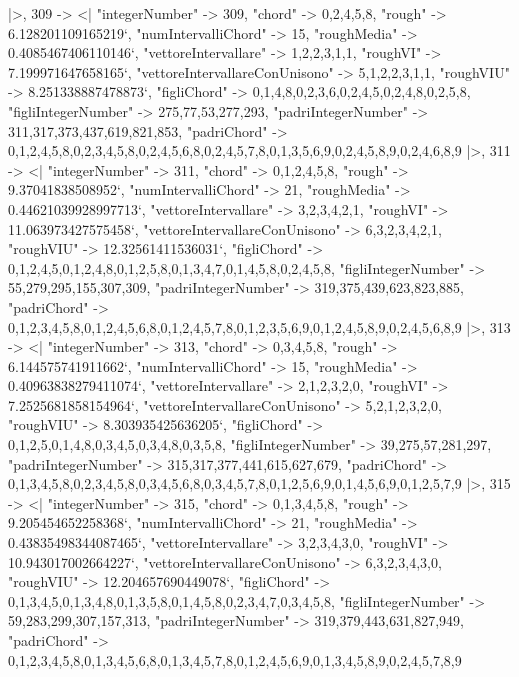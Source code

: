 \documentclass[
]{article}
\begin{document}
\begin{DatasetVerbatim}
  |>,
  309 -> <|
    "integerNumber" -> 309,
    "chord" -> {0,2,4,5,8},
    "rough" -> 6.128201109165219`,
    "numIntervalliChord" -> 15,
    "roughMedia" -> 0.4085467406110146`,
    "vettoreIntervallare" -> {1,2,2,3,1,1},
    "roughVI" -> 7.199971647658165`,
    "vettoreIntervallareConUnisono" -> {5,1,2,2,3,1,1},
    "roughVIU" -> 8.251338887478873`,
    "figliChord" -> {{0,1,4,8},{0,2,3,6},{0,2,4,5},{0,2,4,8},{0,2,5,8}},
    "figliIntegerNumber" -> {275,77,53,277,293},
    "padriIntegerNumber" -> {311,317,373,437,619,821,853},
    "padriChord" -> {{0,1,2,4,5,8},{0,2,3,4,5,8},{0,2,4,5,6,8},{0,2,4,5,7,8},{0,1,3,5,6,9},{0,2,4,5,8,9},{0,2,4,6,8,9}}
  |>,
  311 -> <|
    "integerNumber" -> 311,
    "chord" -> {0,1,2,4,5,8},
    "rough" -> 9.37041838508952`,
    "numIntervalliChord" -> 21,
    "roughMedia" -> 0.44621039928997713`,
    "vettoreIntervallare" -> {3,2,3,4,2,1},
    "roughVI" -> 11.063973427575458`,
    "vettoreIntervallareConUnisono" -> {6,3,2,3,4,2,1},
    "roughVIU" -> 12.32561411536031`,
    "figliChord" -> {{0,1,2,4,5},{0,1,2,4,8},{0,1,2,5,8},{0,1,3,4,7},{0,1,4,5,8},{0,2,4,5,8}},
    "figliIntegerNumber" -> {55,279,295,155,307,309},
    "padriIntegerNumber" -> {319,375,439,623,823,885},
    "padriChord" -> {{0,1,2,3,4,5,8},{0,1,2,4,5,6,8},{0,1,2,4,5,7,8},{0,1,2,3,5,6,9},{0,1,2,4,5,8,9},{0,2,4,5,6,8,9}}
  |>,
  313 -> <|
    "integerNumber" -> 313,
    "chord" -> {0,3,4,5,8},
    "rough" -> 6.144575741911662`,
    "numIntervalliChord" -> 15,
    "roughMedia" -> 0.40963838279411074`,
    "vettoreIntervallare" -> {2,1,2,3,2,0},
    "roughVI" -> 7.2525681858154964`,
    "vettoreIntervallareConUnisono" -> {5,2,1,2,3,2,0},
    "roughVIU" -> 8.303935425636205`,
    "figliChord" -> {{0,1,2,5},{0,1,4,8},{0,3,4,5},{0,3,4,8},{0,3,5,8}},
    "figliIntegerNumber" -> {39,275,57,281,297},
    "padriIntegerNumber" -> {315,317,377,441,615,627,679},
    "padriChord" -> {{0,1,3,4,5,8},{0,2,3,4,5,8},{0,3,4,5,6,8},{0,3,4,5,7,8},{0,1,2,5,6,9},{0,1,4,5,6,9},{0,1,2,5,7,9}}
  |>,
  315 -> <|
    "integerNumber" -> 315,
    "chord" -> {0,1,3,4,5,8},
    "rough" -> 9.205454652258368`,
    "numIntervalliChord" -> 21,
    "roughMedia" -> 0.43835498344087465`,
    "vettoreIntervallare" -> {3,2,3,4,3,0},
    "roughVI" -> 10.943017002664227`,
    "vettoreIntervallareConUnisono" -> {6,3,2,3,4,3,0},
    "roughVIU" -> 12.204657690449078`,
    "figliChord" -> {{0,1,3,4,5},{0,1,3,4,8},{0,1,3,5,8},{0,1,4,5,8},{0,2,3,4,7},{0,3,4,5,8}},
    "figliIntegerNumber" -> {59,283,299,307,157,313},
    "padriIntegerNumber" -> {319,379,443,631,827,949},
    "padriChord" -> {{0,1,2,3,4,5,8},{0,1,3,4,5,6,8},{0,1,3,4,5,7,8},{0,1,2,4,5,6,9},{0,1,3,4,5,8,9},{0,2,4,5,7,8,9}}

\end{DatasetVerbatim}
\end{document}
